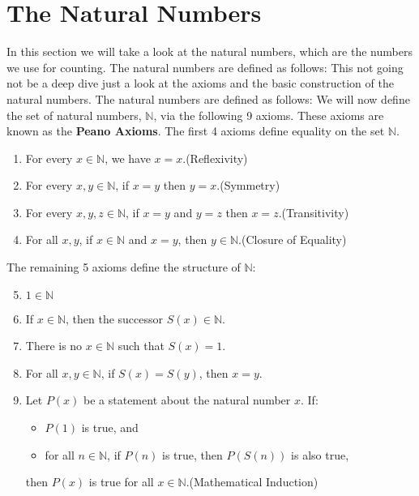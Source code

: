 \newpage
\section{The Natural Numbers}

In this section we will take a look at the natural numbers, which are the numbers we use for counting. The natural numbers are defined as follows:
This not going not be a deep dive just a look at the axioms and the basic construction of the natural numbers. The natural numbers are defined as follows:
\newline
We will now define the set of natural numbers, \( \mathbb{N} \), via the following 9 axioms. These axioms are known as the \textbf{Peano Axioms}. The first 4 axioms define equality on the set \( \mathbb{N} \).

\begin{enumerate}[label=\Roman*.]
	\item For every \( x \in \mathbb{N} \), we have \( x = x \).\hfill (Reflexivity)
	\item For every \( x, y \in \mathbb{N} \), if \( x = y \) then \( y = x \).\hfill (Symmetry)
	\item For every \( x, y, z \in \mathbb{N} \), if \( x = y \) and \( y = z \) then \( x = z \).\hfill (Transitivity)
	\item For all \( x, y \), if \( x \in \mathbb{N} \) and \( x = y \), then \( y \in \mathbb{N} \).\hfill (Closure of Equality)
\end{enumerate}

The remaining 5 axioms define the structure of \( \mathbb{N} \):

\begin{enumerate}[label=\Roman*.]
	\setcounter{enumi}{4}
	\item \( 1 \in \mathbb{N} \)
	\item If \( x \in \mathbb{N} \), then the successor \( S(x) \in \mathbb{N} \).
	\item There is no \( x \in \mathbb{N} \) such that \( S(x) = 1 \).
	\item For all \( x, y \in \mathbb{N} \), if \( S(x) = S(y) \), then \( x = y \).
	\item Let \( P(x) \) be a statement about the natural number \( x \). If:
		\begin{itemize}
			\item \( P(1) \) is true, and
			\item for all \( n \in \mathbb{N} \), if \( P(n) \) is true, then \( P(S(n)) \) is also true,
		\end{itemize}
		then \( P(x) \) is true for all \( x \in \mathbb{N} \).\hfill (Mathematical Induction)
\end{enumerate}

